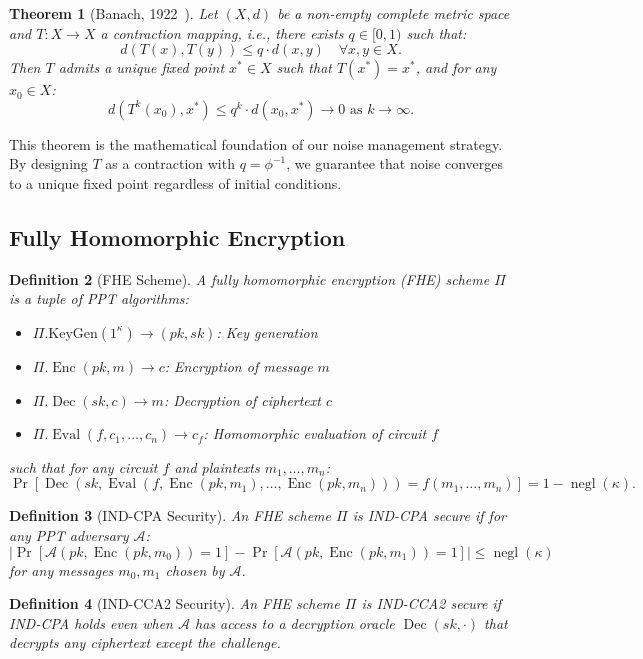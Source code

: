 \documentclass[11pt,a4paper]{article}
\newtheorem{theorem}{Theorem}[section]
\newtheorem{definition}[theorem]{Definition}
\DeclareMathOperator{\Enc}{Enc}
\DeclareMathOperator{\Dec}{Dec}
\DeclareMathOperator{\Eval}{Eval}
\DeclareMathOperator{\negl}{negl}
\begin{document}
\begin{theorem}[Banach, 1922~\cite{banach1922}]
\label{thm:banach_classic}
Let $(X, d)$ be a non-empty complete metric space and $T: X \to X$ a contraction mapping, i.e., there exists $q \in [0,1)$ such that:
\[
d(T(x), T(y)) \leq q \cdot d(x, y) \quad \forall x, y \in X.
\]
Then $T$ admits a unique fixed point $x^* \in X$ such that $T(x^*) = x^*$, and for any $x_0 \in X$:
\[
d(T^k(x_0), x^*) \leq q^k \cdot d(x_0, x^*) \to 0 \text{ as } k \to \infty.
\]
\end{theorem}

This theorem is the mathematical foundation of our noise management strategy. By designing $T$ as a contraction with $q = \phi^{-1}$, we guarantee that noise converges to a unique fixed point regardless of initial conditions.

\subsection{Fully Homomorphic Encryption}

\begin{definition}[FHE Scheme]
\label{def:fhe}
A fully homomorphic encryption (FHE) scheme $\Pi$ is a tuple of PPT algorithms:
\begin{itemize}[leftmargin=*,itemsep=1pt]
    \item $\Pi.\text{KeyGen}(1^\kappa) \to (pk, sk)$: Key generation
    \item $\Pi.\Enc(pk, m) \to c$: Encryption of message $m$
    \item $\Pi.\Dec(sk, c) \to m$: Decryption of ciphertext $c$
    \item $\Pi.\Eval(f, c_1, \ldots, c_n) \to c_f$: Homomorphic evaluation of circuit $f$
\end{itemize}
such that for any circuit $f$ and plaintexts $m_1, \ldots, m_n$:
\[
\Pr[\Dec(sk, \Eval(f, \Enc(pk, m_1), \ldots, \Enc(pk, m_n))) = f(m_1, \ldots, m_n)] = 1 - \negl(\kappa).
\]
\end{definition}

\begin{definition}[IND-CPA Security]
\label{def:indcpa}
An FHE scheme $\Pi$ is IND-CPA secure if for any PPT adversary $\mathcal{A}$:
\[
\left|\Pr[\mathcal{A}(pk, \Enc(pk, m_0)) = 1] - \Pr[\mathcal{A}(pk, \Enc(pk, m_1)) = 1]\right| \leq \negl(\kappa)
\]
for any messages $m_0, m_1$ chosen by $\mathcal{A}$.
\end{definition}

\begin{definition}[IND-CCA2 Security]
\label{def:indcca2}
An FHE scheme $\Pi$ is IND-CCA2 secure if IND-CPA holds even when $\mathcal{A}$ has access to a decryption oracle $\Dec(sk, \cdot)$ that decrypts any ciphertext except the challenge.
\end{definition}
\end{document}
